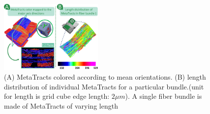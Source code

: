 


\begin{figure}[tb]
\centering
	\includegraphics[width=0.45\textwidth]{images_pvis/figure5.png}
	\caption{(A) MetaTracts colored according to mean orientations. (B) length distribution of individual MetaTracts for a particular bundle.(unit for length is grid cube edge length:  $2\mu m$). A single fiber bundle is made of MetaTracts of varying length}
	\label{fig:length_distribution}
\end{figure}


